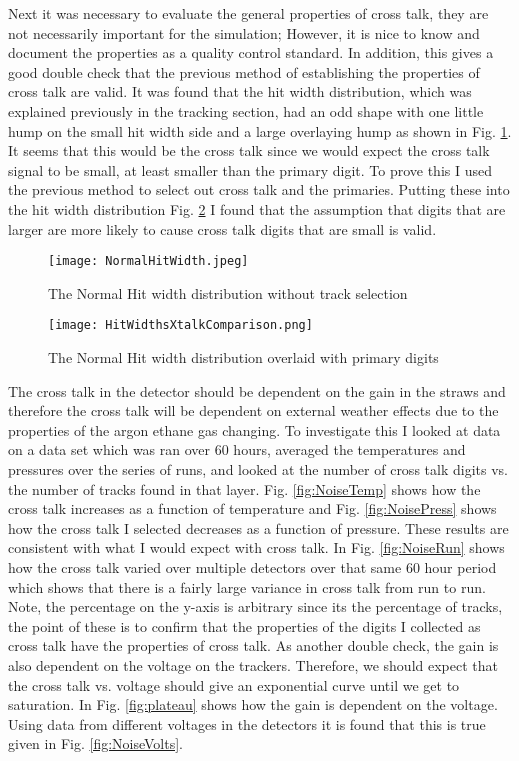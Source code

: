 \documentclass[./Thesis]{subfiles}
\begin{document}
	Next it was necessary to evaluate the general properties of cross talk, they are not necessarily important for the simulation; However, it is nice to know and document the properties as a quality control standard. In addition, this gives a good double check that the previous method of establishing the properties of cross talk are valid. It was found that the hit width distribution, which was explained previously in the tracking section, had an odd shape with one little hump on the small hit width side and a large overlaying hump as shown in Fig. \ref{fig:hitWidth}. It seems that this would be the cross talk since we would expect the cross talk signal to be small, at least smaller than the primary digit. To prove this I used the previous method to select out cross talk and the primaries. Putting these into the hit width distribution Fig. \ref{fig:hitWidthAll} I found that the assumption that digits that are larger are more likely to cause cross talk digits that are small is valid. 
	
\begin{figure}
	\centerline{\texttt{[image: NormalHitWidth.jpeg]}}
	\caption[ HitWidth]{ The Normal Hit width distribution without track selection}
	\label{fig:hitWidth}
\end{figure}


\begin{figure}
	\centerline{\texttt{[image: HitWidthsXtalkComparison.png]}}
	\caption[ HitWidth with cross talk and primary digits]{ The Normal Hit width distribution overlaid with primary digits }
	\label{fig:hitWidthAll}
\end{figure}

	
	
	 The cross talk in the detector should be dependent on the gain in the straws and therefore the cross talk will be dependent on external weather effects due to the properties of the argon ethane gas changing. To investigate this I looked at data on a data set which was ran over 60 hours, averaged the temperatures and pressures over the series of runs, and looked at the number of cross talk digits vs. the number of tracks found in that layer. Fig. \ref{fig:NoiseTemp} shows how the cross talk increases as a function of temperature and Fig. \ref{fig:NoisePress} shows how the cross talk I selected decreases as a function of pressure. These results are consistent with what I would expect with cross talk. In Fig. \ref{fig:NoiseRun} shows how the cross talk varied over multiple detectors over that same 60 hour period which shows that there is a fairly large variance in cross talk from run to run. Note, the percentage on the y-axis is arbitrary since its the percentage of tracks, the point of these is to confirm that the properties of the digits I collected as cross talk have the properties of cross talk.  As another double check, the gain is also dependent on the voltage on the trackers. Therefore, we should expect that the cross talk vs. voltage should give an exponential curve until we get to saturation. In Fig. \ref{fig:plateau} shows how the gain is dependent on the voltage. Using data from different voltages in the detectors it is found that this is true given in Fig. \ref{fig:NoiseVolts}.
	
\end{document}
